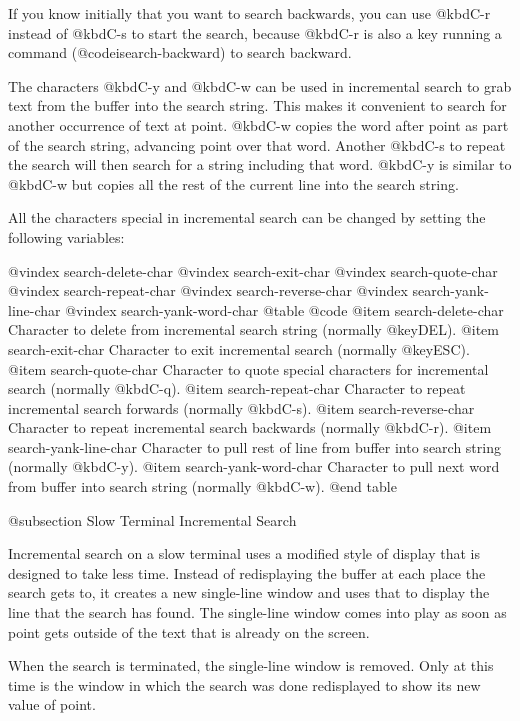 {{{{{{{{  If you know initially that you want to search backwards, you can
use @kbd{C-r} instead of @kbd{C-s} to start the search, because @kbd{C-r}
is also a key running a command (@code{isearch-backward}) to search
backward.

  The characters @kbd{C-y} and @kbd{C-w} can be used in incremental search
to grab text from the buffer into the search string.  This makes it
convenient to search for another occurrence of text at point.  @kbd{C-w}
copies the word after point as part of the search string, advancing
point over that word.  Another @kbd{C-s} to repeat the search will then
search for a string including that word.  @kbd{C-y} is similar to @kbd{C-w}
but copies all the rest of the current line into the search string.

  All the characters special in incremental search can be changed by setting
the following variables:

@vindex search-delete-char
@vindex search-exit-char
@vindex search-quote-char
@vindex search-repeat-char
@vindex search-reverse-char
@vindex search-yank-line-char
@vindex search-yank-word-char
@table @code
@item search-delete-char
Character to delete from incremental search string (normally @key{DEL}).
@item search-exit-char
Character to exit incremental search (normally @key{ESC}).
@item search-quote-char
Character to quote special characters for incremental search (normally
@kbd{C-q}).
@item search-repeat-char
Character to repeat incremental search forwards (normally @kbd{C-s}).
@item search-reverse-char
Character to repeat incremental search backwards (normally @kbd{C-r}).
@item search-yank-line-char
Character to pull rest of line from buffer into search string
(normally @kbd{C-y}).
@item search-yank-word-char
Character to pull next word from buffer into search string (normally
@kbd{C-w}).
@end table

@subsection Slow Terminal Incremental Search

  Incremental search on a slow terminal uses a modified style of display
that is designed to take less time.  Instead of redisplaying the buffer at
each place the search gets to, it creates a new single-line window and uses
that to display the line that the search has found.  The single-line window
comes into play as soon as point gets outside of the text that is already
on the screen.

  When the search is terminated, the single-line window is removed.  Only
at this time is the window in which the search was done redisplayed to show
its new value of point.

}}}}}}}}
